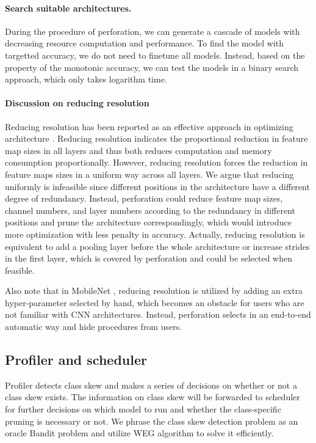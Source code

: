 \documentclass[pageno]{jpaper}
\begin{document}

\paragraph{Search suitable architectures.}
During the procedure of perforation, we can generate a cascade of models with decreasing resource computation and performance. To find the model with targetted accuracy, we do not need to finetune all models. Instead, based on the property of the monotonic accuracy, we can test the models in a binary search approach, which only takes logarithm time.

\paragraph{Discussion on reducing resolution}
Reducing resolution has been reported as an effective approach in optimizing architecture \cite{krizhevsky2009learning, fu2017look, howard2017mobilenets}. Reducing resolution indicates the proportional reduction in feature map sizes in all layers and thus both reduces computation and memory consumption proportionally. However, reducing resolution forces the reduction in feature maps sizes in a uniform way across all layers. We argue that reducing uniformly is infeasible since different positions in the architecture have a different degree of redundancy. Instead, perforation could reduce feature map sizes, channel numbers, and layer numbers according to the redundancy in different positions and prune the architecture correspondingly, which would introduce more optimization with less penalty in accuracy. Actually, reducing resolution is equivalent to add a pooling layer before the whole architecture or increase strides in the first layer, which is covered by perforation and could be selected when feasible.

Also note that in MobileNet \cite{howard2017mobilenets}, reducing resolution is utilized by adding an extra hyper-parameter selected by hand, which becomes an obstacle for users who are not familiar with CNN architectures. Instead, perforation selects in an end-to-end automatic way and hide procedures from users.



\subsection{Profiler and scheduler} \label{profilerSection}
Profiler detects class skew and makes a series of decisions on whether or not a class skew exists. The information on class skew will be forwarded to scheduler for further decisions on which model to run and whether the class-specific pruning is necessary or not. We phrase the class skew detection problem as an oracle Bandit problem \cite{auer2002finite, lai1985asymptotically} and utilize WEG algorithm \cite{shen2016fast} to solve it efficiently.
\end{document}
